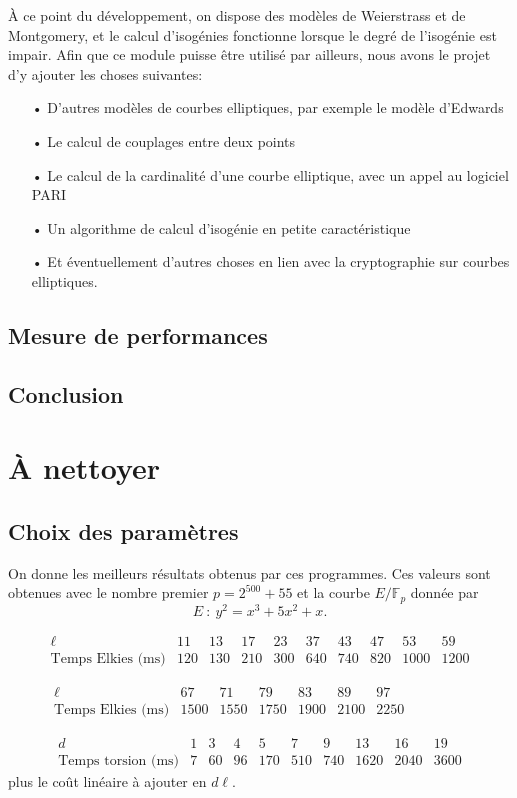 \documentclass[11pt,a4paper]{article}
\newcommand{\F}{\mathbb{F}}
\theoremstyle{definition}
\begin{document}
À ce point du développement, on dispose des modèles de Weierstrass et de Montgomery, et le calcul d'isogénies fonctionne lorsque le degré de l'isogénie est impair. Afin que ce module puisse être utilisé par ailleurs, nous avons le projet d'y ajouter les choses suivantes:

\begin{itemize}
\item[•] D'autres modèles de courbes elliptiques, par exemple le modèle d'Edwards
\item[•] Le calcul de couplages entre deux points
\item[•] Le calcul de la cardinalité d'une courbe elliptique, avec un appel au logiciel PARI
\item[•] Un algorithme de calcul d'isogénie en petite caractéristique
\item[•] Et éventuellement d'autres choses en lien avec la cryptographie sur courbes elliptiques.
\end{itemize}


\subsection{Mesure de performances}

\subsection{Conclusion}

\newpage

\section{À nettoyer}


\subsection{Choix des paramètres}

On donne les meilleurs résultats obtenus par ces programmes. Ces valeurs sont obtenues avec le nombre premier $ p = 2^{500} + 55$ et la courbe $E/\F_p$ donnée par
$$E\ :\ y^2 = x^3 + 5x^2 + x.$$

$$\begin{matrix}
\ell & 11 & 13 & 17 & 23 & 37 & 43 & 47 & 53 & 59 \\
\text{Temps\ Elkies\ (ms)} & 120 & 130 & 210 & 300 & 640 & 740 & 820 & 1000 & 1200 
\end{matrix}$$

$$\begin{matrix}
\ell & 67 & 71 & 79 & 83 & 89 & 97 &\qquad & &\\
\text{Temps\ Elkies\ (ms)} & 1500 & 1550 & 1750 & 1900 & 2100 & 2250 & & &
\end{matrix}$$

$$\begin{matrix}
d & 1 & 3 & 4 & 5 & 7 & 9 & 13 & 16 & 19\\
\text{Temps\ torsion\ (ms)} & 7 & 60 & 96 & 170 & 510 & 740 & 1620 & 2040 & 3600
\end{matrix}$$
plus le coût linéaire à ajouter en $d\ell$.
\newpage





\end{document}
